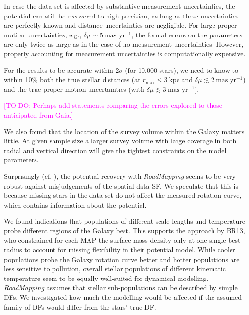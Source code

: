 \documentclass[iop,revtex4]{emulateapj}
\newcommand{\MAP}{MAP}
\newcommand{\RM}{{\sl RoadMapping}}
\newcommand{\Wilma}[1]{\textcolor{Magenta}{#1}}
\begin{document}
In case the data set is affected by substantive measurement uncertainties, the potential can still be recovered to high precision, as long as these uncertainties are perfectly known and distance uncertainties are negligible. For large proper motion uncertainties, e.g., $\delta \mu \sim 5~\text{mas yr}^{-1}$, the formal errors on the parameters are only twice as large as in the case of no measurement uncertainties. However, properly accounting for measurement uncertainties is computationally expensive.

For the results to be accurate within $2\sigma$ (for 10,000 stars), we need to know to within 10\% both the true stellar distances (at $r_\text{max} \leq 3~\text{kpc}$ and $\delta \mu \lesssim 2 ~ \text{mas yr}^{-1}$) and the true proper motion uncertainties (with $\delta \mu \lesssim 3 ~ \text{mas yr}^{-1}$).

\Wilma{[TO DO: Perhaps add statements comparing the errors explored to those anticipated from Gaia.]}

We also found that the location of the survey volume within the Galaxy matters little. At given sample size a larger survey volume with large coverage in both radial and vertical direction will give the tightest constraints on the model parameters.

Surprisingly (cf. \citealt{2013A&ARv..21...61R}), the potential recovery with \RM{} seems to be very robust against misjudgements of the spatial data SF. We speculate that this is because missing stars in the data set do not affect the measured rotation curve, which contains information about the potential.

We found indications that populations of different scale lengths and temperature probe different regions of the Galaxy best. This supports the approach by BR13, who constrained for each \MAP{} the surface mass density only at one single best radius to account for missing flexibility in their potential model. While cooler populations probe the Galaxy rotation curve better and hotter populations are less sensitive to pollution, overall stellar populations of different kinematic temperature seem to be equally well-suited for dynamical modelling.\\

 \RM{} assumes that stellar sub-populations can be described by simple DFs. We investigated how much the modelling would be affected if the assumed family of DFs would differ from the stars' true DF.
\end{document}
